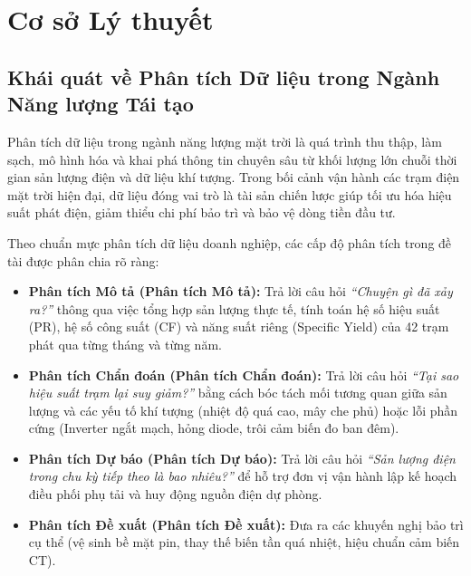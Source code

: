 \documentclass[12pt, a4paper]{report}
\begin{document}
\section{Cơ sở Lý thuyết}
\label{sec:co_so_ly_thuyet}

\subsection{Khái quát về Phân tích Dữ liệu trong Ngành Năng lượng Tái tạo}
Phân tích dữ liệu trong ngành năng lượng mặt trời là quá trình thu thập, làm sạch, mô hình hóa và khai phá thông tin chuyên sâu từ khối lượng lớn chuỗi thời gian sản lượng điện và dữ liệu khí tượng. Trong bối cảnh vận hành các trạm điện mặt trời hiện đại, dữ liệu đóng vai trò là tài sản chiến lược giúp tối ưu hóa hiệu suất phát điện, giảm thiểu chi phí bảo trì và bảo vệ dòng tiền đầu tư.

Theo chuẩn mực phân tích dữ liệu doanh nghiệp, các cấp độ phân tích trong đề tài được phân chia rõ ràng:
\begin{itemize}[noitemsep]
    \item \textbf{Phân tích Mô tả (Phân tích Mô tả):} Trả lời câu hỏi \textit{``Chuyện gì đã xảy ra?''} thông qua việc tổng hợp sản lượng thực tế, tính toán hệ số hiệu suất (PR), hệ số công suất (CF) và năng suất riêng (Specific Yield) của 42 trạm phát qua từng tháng và từng năm.
    \item \textbf{Phân tích Chẩn đoán (Phân tích Chẩn đoán):} Trả lời câu hỏi \textit{``Tại sao hiệu suất trạm lại suy giảm?''} bằng cách bóc tách mối tương quan giữa sản lượng và các yếu tố khí tượng (nhiệt độ quá cao, mây che phủ) hoặc lỗi phần cứng (Inverter ngắt mạch, hỏng diode, trôi cảm biến đo ban đêm).
    \item \textbf{Phân tích Dự báo (Phân tích Dự báo):} Trả lời câu hỏi \textit{``Sản lượng điện trong chu kỳ tiếp theo là bao nhiêu?''} để hỗ trợ đơn vị vận hành lập kế hoạch điều phối phụ tải và huy động nguồn điện dự phòng.
    \item \textbf{Phân tích Đề xuất (Phân tích Đề xuất):} Đưa ra các khuyến nghị bảo trì cụ thể (vệ sinh bề mặt pin, thay thế biến tần quá nhiệt, hiệu chuẩn cảm biến CT).
\end{itemize}
\end{document}
